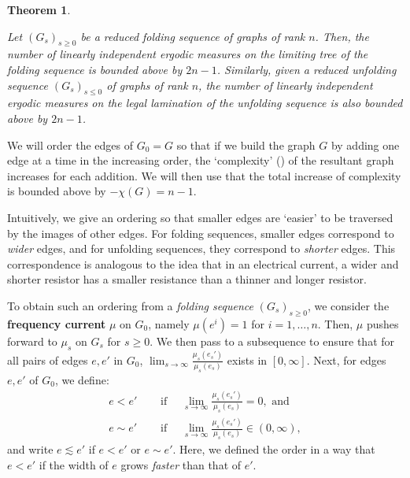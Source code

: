 \documentclass[11pt, letterpaper]{amsart}
\theoremstyle{plain}
\newtheorem{theorem}{Theorem}[section]
\theoremstyle{definition}
\begin{document}
\begin{theorem}
\label{thm:Main_Upperbound}

Let $( G_{s} )_{s \ge 0}$ be a reduced folding sequence of graphs of rank $n$. Then, the
number of linearly independent ergodic measures on the limiting tree of the
folding sequence is bounded above by $2n-1$.
Similarly, given a reduced unfolding sequence $( G_s )_{s \le 0}$ of graphs of rank $n$, the
number of linearly independent ergodic measures on the legal lamination of the
unfolding sequence is also bounded above by $2n-1$.
\end{theorem}

We will order the edges of $G_0 = G$ so that if we build the graph $G$ by adding one edge at a time in the increasing
order, the `complexity' () of the resultant graph increases for
each addition. We will then use that the total increase of complexity is bounded above
by $-\chi(G)=n-1$.

Intuitively, we give an ordering so that smaller edges are `easier' to be
traversed by the images of other edges. For folding sequences, smaller edges correspond to
\emph{wider} edges, and for unfolding
sequences, they correspond to \emph{shorter} edges. This correspondence is analogous to the idea that in an electrical current, a wider and shorter resistor
has a smaller resistance than a thinner and longer resistor.

To obtain such an ordering from a \emph{folding sequence} $(G_s)_{s \ge 0}$,
we consider the \textbf{frequency current} $\mu$ on $G_0$,
namely $\mu(e^i) = 1$ for $i=1,\ldots,n$. Then, $\mu$ pushes forward to $\mu_s$
on $G_s$ for
$s \ge 0$.
We then pass to a subsequence to ensure that for all pairs of edges $e, e'$ in $G_0$, $\lim_{s
  \to \infty} \frac{\mu_s(e_s')}{\mu_s(e_s)}$  
exists in $[0,\infty]$. Next, for edges $e, e'$ of $G_0$, we define:
\begin{align*}
  e < e' \quad & \text{ if } \quad \lim_{s \to \infty} \frac{\mu_s(e_s')}{\mu_s(e_s)} = 0, \text{ and} \\
  e \sim e' \quad & \text{ if } \quad \lim_{s \to \infty} \frac{\mu_s(e_s')}{\mu_s(e_s)} \in (0,\infty),
\end{align*}
and write $e \lesssim e'$ if $e < e'$ or $e \sim e'$. Here, we defined the order in a way that
$e<e'$ if the width of $e$ grows \emph{faster} than that of $e'$.
\end{document}
